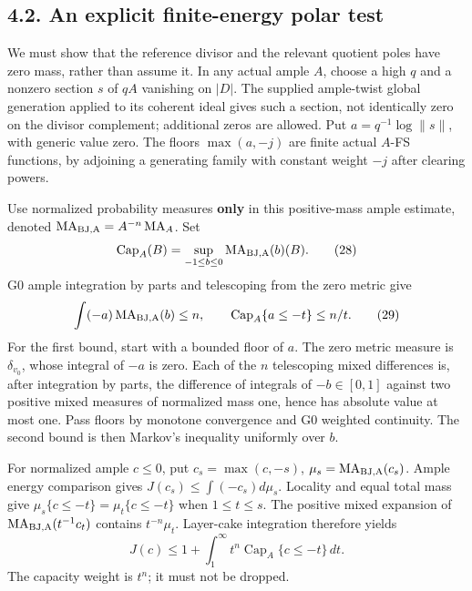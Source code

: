 \documentclass[
  10pt,
]{article}
\begin{document}
\subsection{4.2. An explicit finite-energy polar
test}\label{an-explicit-finite-energy-polar-test}

We must show that the reference divisor and the relevant quotient poles
have zero mass, rather than assume it. In any actual ample \(A\), choose
a high \(q\) and a nonzero section \(s\) of \(qA\) vanishing on \(|D|\).
The supplied ample-twist global generation applied to its coherent ideal
gives such a section, not identically zero on the divisor complement;
additional zeros are allowed. Put \(a=q^{-1}\log\|s\|\), with generic
value zero. The floors \(\max(a,-j)\) are finite actual \(A\)-FS
functions, by adjoining a generating family with constant weight \(-j\)
after clearing powers.

Use normalized probability measures \textbf{only} in this positive-mass
ample estimate, denoted
\(\operatorname{MA}_{\rm BJ,A}=A^{-n}\operatorname{MA}_A\). Set
\[\operatorname{Cap}_A(B)=\sup_{-1\leq b\leq0}\operatorname{MA}_{\rm BJ,A}(b)(B).\tag{28}\]
G0 ample integration by parts and telescoping from the zero metric give
\[\int(-a)\operatorname{MA}_{\rm BJ,A}(b)\leq n,
\qquad \operatorname{Cap}_A\{a\leq-t\}\leq n/t.\tag{29}\] For the first
bound, start with a bounded floor of \(a\). The zero metric measure is
\(\delta_{v_0}\), whose integral of \(-a\) is zero. Each of the \(n\)
telescoping mixed differences is, after integration by parts, the
difference of integrals of \(-b\in[0,1]\) against two positive mixed
measures of normalized mass one, hence has absolute value at most one.
Pass floors by monotone convergence and G0 weighted continuity. The
second bound is then Markov's inequality uniformly over \(b\).

For normalized ample \(c\leq0\), put \(c_s=\max(c,-s)\),
\(\mu_s=\operatorname{MA}_{\rm BJ,A}(c_s)\). Ample energy comparison
gives \(J(c_s)\leq\int(-c_s)d\mu_s\). Locality and equal total mass give
\(\mu_s\{c\leq-t\}=\mu_t\{c\leq-t\}\) when \(1\leq t\leq s\). The
positive mixed expansion of \(\operatorname{MA}_{\rm BJ,A}(t^{-1}c_t)\)
contains \(t^{-n}\mu_t\). Layer-cake integration therefore yields
\[J(c)\leq1+\int_1^\infty t^n\operatorname{Cap}_A\{c\leq-t\}\,dt.\tag{30}\]
The capacity weight is \(t^n\); it must not be dropped.
\end{document}

